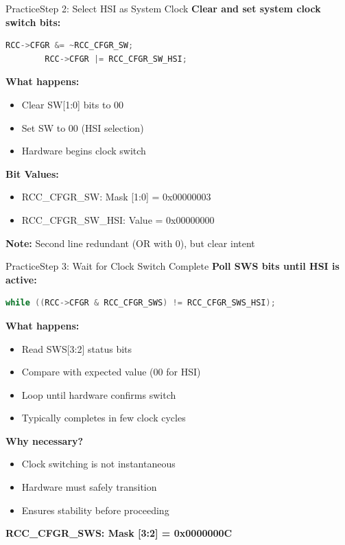 \documentclass{beamer}
\begin{document}
\begin{frame}[fragile]{Practice}{Step 2: Select HSI as System Clock}
	\textbf{Clear and set system clock switch bits:}
	\begin{lstlisting}[language=C, basicstyle=\ttfamily\small]
		RCC->CFGR &= ~RCC_CFGR_SW;
		RCC->CFGR |= RCC_CFGR_SW_HSI;
	\end{lstlisting}
	
	\medskip
	\textbf{What happens:}
	\begin{itemize}
		\item Clear SW[1:0] bits to 00
		\item Set SW to 00 (HSI selection)
		\item Hardware begins clock switch
	\end{itemize}
	
	\medskip
	\textbf{Bit Values:}
	\begin{itemize}
		\item RCC\_CFGR\_SW: Mask [1:0] = 0x00000003
		\item RCC\_CFGR\_SW\_HSI: Value = 0x00000000
	\end{itemize}
	
	\smallskip
	\textbf{Note:} Second line redundant (OR with 0), but clear intent
\end{frame}

\begin{frame}[fragile]{Practice}{Step 3: Wait for Clock Switch Complete}
	\textbf{Poll SWS bits until HSI is active:}
	\begin{lstlisting}[language=C, basicstyle=\ttfamily\small]
		while ((RCC->CFGR & RCC_CFGR_SWS) != RCC_CFGR_SWS_HSI);
	\end{lstlisting}
	
	\medskip
	\textbf{What happens:}
	\begin{itemize}
		\item Read SWS[3:2] status bits
		\item Compare with expected value (00 for HSI)
		\item Loop until hardware confirms switch
		\item Typically completes in few clock cycles
	\end{itemize}
	
	\medskip
	\textbf{Why necessary?}
	\begin{itemize}
		\item Clock switching is not instantaneous
		\item Hardware must safely transition
		\item Ensures stability before proceeding
	\end{itemize}
	
	\smallskip
	\textbf{RCC\_CFGR\_SWS: Mask [3:2] = 0x0000000C}
\end{frame}
\end{document}
